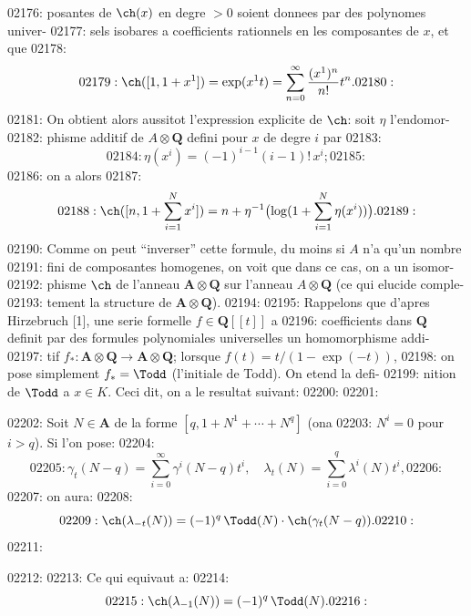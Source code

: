 02176: posantes de $\ch(x)$ en degre $> 0$ soient donnees par des polynomes univer-
02177: sels isobares a coefficients rationnels en les composantes de $x$, et que
02178: \begin{equation}
02179: \ch([1, 1+x^1]) = \exp(x^1 t) = \sum_{n=0}^{\infty} \frac{(x^1)^n}{n!} t^n.
02180: \end{equation}
02181: On obtient alors aussitot l'expression explicite de $\ch$: soit $\eta$ l'endomor-
02182: phisme additif de $A \otimes \mathbf{Q}$ defini pour $x$ de degre $i$ par
02183: \begin{equation}
02184: \eta(x^i) = (-1)^{i-1} (i-1)! \, x^i;
02185: \end{equation}
02186: on a alors
02187: \begin{equation}
02188: \ch([n, 1 + \sum_{i=1}^{N} x^i]) = n + \eta^{-1}\bigl(\log(1 + \sum_{i=1}^{N} \eta(x^i))\bigr).
02189: \end{equation}
02190: Comme on peut ``inverser'' cette formule, du moins si $A$ n'a qu'un nombre
02191: fini de composantes homogenes, on voit que dans ce cas, on a un isomor-
02192: phisme $\ch$ de l'anneau $\mathbf{A} \otimes \mathbf{Q}$ sur l'anneau $A \otimes \mathbf{Q}$ (ce qui elucide comple-
02193: tement la structure de $\mathbf{A} \otimes \mathbf{Q}$).
02194: 
02195: Rappelons que d'apres Hirzebruch [1], une serie formelle $f \in \mathbf{Q}[[t]]$ a
02196: coefficients dans $\mathbf{Q}$ definit par des formules polynomiales universelles un homomorphisme addi-
02197: tif $f_{*}: \mathbf{A} \otimes \mathbf{Q} \to \mathbf{A} \otimes \mathbf{Q}$; lorsque $f(t) = t/(1 - \exp(-t))$,
02198: on pose simplement $f_{*} = \Todd$ (l'initiale de Todd). On etend la defi-
02199: nition de $\Todd$ a $x \in K$. Ceci dit, on a le resultat suivant:
02200: 
02201: \begin{proposition}
02202: Soit $N \in \mathbf{A}$ de la forme $[q, 1+N^1+\cdots+N^q]$ (ona
02203: $N^i = 0$ pour $i > q$). Si l'on pose:
02204: \[
02205: \gamma_t(N-q) = \sum_{i=0}^{\infty} \gamma^i(N-q) t^i, \quad \lambda_t(N) = \sum_{i=0}^{q} \lambda^i(N) t^i,
02206: \]
02207: on aura:
02208: \begin{equation}
02209: \ch(\lambda_{-t}(N)) = (-1)^q \, \Todd(N) \cdot \ch(\gamma_t(N-q)).
02210: \end{equation}
02211: \end{proposition}
02212: 
02213: Ce qui equivaut a:
02214: \begin{equation}
02215: \ch(\lambda_{-1}(N)) = (-1)^q \, \Todd(N).
02216: \end{equation}
